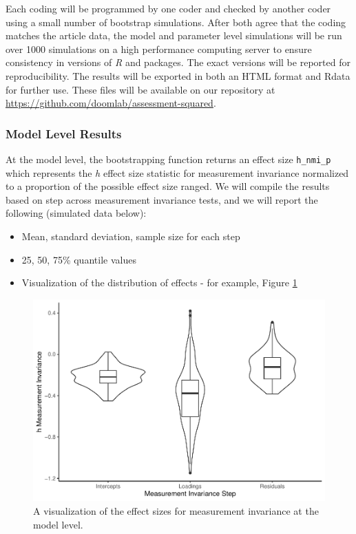 \documentclass[
  man]{apa7}
\providecommand{\tightlist}{%
  \setlength{\itemsep}{0pt}\setlength{\parskip}{0pt}}
\begin{document}
Each coding will be programmed by one coder and checked by another coder using a small number of bootstrap simulations. After both agree that the coding matches the article data, the model and parameter level simulations will be run over 1000 simulations on a high performance computing server to ensure consistency in versions of \emph{R} and packages. The exact versions will be reported for reproducibility. The results will be exported in both an HTML format and Rdata for further use. These files will be available on our repository at \url{https://github.com/doomlab/assessment-squared}.

\hypertarget{model-level-results}{%
\subsubsection{Model Level Results}\label{model-level-results}}

At the model level, the bootstrapping function returns an effect size \texttt{h\_nmi\_p} which represents the \emph{h} effect size statistic for measurement invariance normalized to a proportion of the possible effect size ranged. We will compile the results based on step across measurement invariance tests, and we will report the following (simulated data below):

\begin{itemize}
\tightlist
\item
  Mean, standard deviation, sample size for each step
\item
  25, 50, 75\% quantile values
\item
  Visualization of the distribution of effects - for example, Figure \ref{fig:figure-violin}
\end{itemize}

\begin{figure}
\centering
\includegraphics{rr_manuscript_files/figure-latex/figure-violin-1.pdf}
\caption{\label{fig:figure-violin}A visualization of the effect sizes for measurement invariance at the model level.}
\end{figure}
\end{document}
